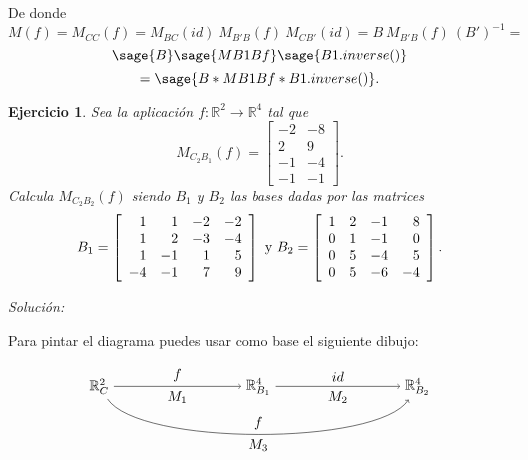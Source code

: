 \documentclass{amsart}
\newtheorem{ejer}{Ejercicio}
\def\r{\mathbb{R}}
\begin{document}
De donde 
\[ M(f) = M_{CC}(f) = M_{BC}(id) \ M_{B'B}(f) \ M_{CB'}(id) = B \ M_{B'B}(f) \ (B')^{-1} = \] 
\[ \sage{B}\sage{MB1Bf}\sage{B1.inverse()} \] 
\[ = \sage{B*MB1Bf*B1.inverse()}. \]



\begin{ejer} 
Sea la aplicación $f: \r^2\to \r^4$ tal que 
\[ M_{C_2B_1}(f) = \left[ \begin{array}{rr} -2 & -8 \\ 2 & 9 \\ -1 & -4 \\ 
-1 & -1 \end{array} \right]. \] Calcula $M_{C_2B_2}(f)$ siendo $B_1$ y $B_2$ 
las bases dadas por las matrices 
\[ B_1 = \left[ \begin{array}{rrrr} 1 & 1 & -2 & -2\\ 1 & 2 & -3 & -4\\ 
1 & -1 & 1 & 5\\ -4 & -1 & 7 & 9 \end{array} \right] \ \hbox{y} \ 
B_2 = \left[ \begin{array}{rrrr} 1 & 2 & -1 & 8\\ 0 & 1 & -1 & 0\\ 
0 & 5 & -4 & 5\\ 0 & 5 & -6 & -4 \end{array} \right].  \]
\end{ejer}

{\it Soluci\'on:}

Para pintar el diagrama puedes usar como base el siguiente dibujo:

$$
\begin{tikzpicture}[xscale = 2]
\node (RC)  at (0,0) {$\r^2_C$};
\node (RB1) at (2,0) {$\r^4_{B_1}$};
\node (RB2) at (4,0) {$\r^4_{B_2}$};
\draw[->] (RC)  to node [above] {$f$} 
                   node [below] {$M_1$} (RB1);
\draw[->] (RB1) to node [above] {$id$} 
                   node [below] {$M_2$} (RB2); 
\draw[->] (RC) .. controls (0.5,-1.5) and (3.5,-1.5) .. 
               node [above] {$f$}
               node [below] {$M_3$} (RB2);
\end{tikzpicture}
$$


\end{document}
